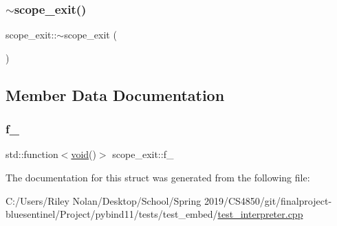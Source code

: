 \mbox{\label{structscope__exit_a3aadbee6fe3862b5ce6f235ec2a7140d}} 
\subsubsection{\texorpdfstring{$\sim$scope\_exit()}{~scope\_exit()}}
{\footnotesize\ttfamily scope\+\_\+exit\+::$\sim$scope\+\_\+exit (\begin{DoxyParamCaption}{ }\end{DoxyParamCaption})\hspace{0.3cm}{\ttfamily [inline]}}



\subsection{Member Data Documentation}
\mbox{\label{structscope__exit_a87593924419e470d257f31b1c74d3f1e}} 
\subsubsection{\texorpdfstring{f\_}{f\_}}
{\footnotesize\ttfamily std\+::function$<$\mbox{\hyperlink{_s_d_l__opengles2__gl2ext_8h_ae5d8fa23ad07c48bb609509eae494c95}{void}}()$>$ scope\+\_\+exit\+::f\+\_\+}



The documentation for this struct was generated from the following file\+:\begin{DoxyCompactItemize}
\item 
C\+:/\+Users/\+Riley Nolan/\+Desktop/\+School/\+Spring 2019/\+C\+S4850/git/finalproject-\/bluesentinel/\+Project/pybind11/tests/test\+\_\+embed/\mbox{\hyperlink{test__interpreter_8cpp}{test\+\_\+interpreter.\+cpp}}\end{DoxyCompactItemize}
